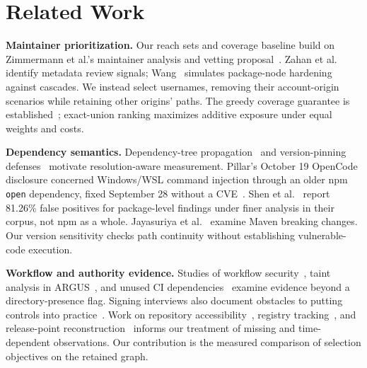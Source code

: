\section{Related Work}
\textbf{Maintainer prioritization.} Our reach sets and coverage baseline build on Zimmermann et al.'s maintainer analysis and vetting proposal~\cite{zimmermann2019}. Zahan et al.~\cite{zahan2022} identify metadata review signals; Wang~\cite{wang2026} simulates package-node hardening against cascades. We instead select usernames, removing their account-origin scenarios while retaining other origins' paths. The greedy coverage guarantee is established~\cite{nemhauser1978}; exact-union ranking maximizes additive exposure under equal weights and costs.

\textbf{Dependency semantics.} Dependency-tree propagation~\cite{liu2022} and version-pinning defenses~\cite{he2025} motivate resolution-aware measurement. Pillar's October 19 OpenCode disclosure concerned Windows/WSL command injection through an older npm \texttt{open} dependency, fixed September 28 without a CVE~\cite{opencode2026}. Shen et al.~\cite{gao2025emse} report 81.26\% false positives for package-level findings under finer analysis in their corpus, not npm as a whole. Jayasuriya et al.~\cite{jayasuriya2024} examine Maven breaking changes. Our version sensitivity checks path continuity without establishing vulnerable-code execution.

\textbf{Workflow and authority evidence.} Studies of workflow security~\cite{koishybayev2022}, taint analysis in ARGUS~\cite{muralee2023}, and unused CI dependencies~\cite{weeraddana2024} examine evidence beyond a directory-presence flag. Signing interviews also document obstacles to putting controls into practice~\cite{okafor2025}. Work on repository accessibility~\cite{tsakpinis2024}, registry tracking~\cite{pinckney2023}, and release-point reconstruction~\cite{rahman2026} informs our treatment of missing and time-dependent observations. Our contribution is the measured comparison of selection objectives on the retained graph.
